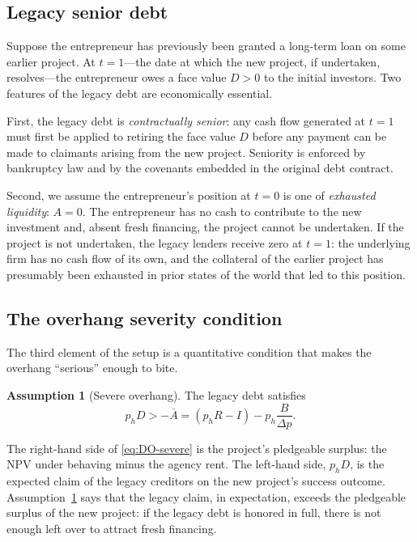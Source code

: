 \documentclass[11pt,a4paper,oneside]{book}
\theoremstyle{plain}
\theoremstyle{definition}
\newtheorem{assumption}[theorem]{Assumption}
\theoremstyle{remark}
\numberwithin{equation}{chapter}
\begin{document}
\subsection{Legacy senior debt}

Suppose the entrepreneur has previously been granted a long-term loan on some earlier project.
At $t=1$---the date at which the new project, if undertaken, resolves---the entrepreneur owes a face value $D > 0$ to the initial investors.
Two features of the legacy debt are economically essential.

First, the legacy debt is \emph{contractually senior}: any cash flow generated at $t=1$ must first be applied to retiring the face value $D$ before any payment can be made to claimants arising from the new project.
Seniority is enforced by bankruptcy law and by the covenants embedded in the original debt contract.

Second, we assume the entrepreneur's position at $t=0$ is one of \emph{exhausted liquidity}: $A = 0$.
The entrepreneur has no cash to contribute to the new investment and, absent fresh financing, the project cannot be undertaken.
If the project is not undertaken, the legacy lenders receive zero at $t=1$: the underlying firm has no cash flow of its own, and the collateral of the earlier project has presumably been exhausted in prior states of the world that led to this position.

\subsection{The overhang severity condition}

The third element of the setup is a quantitative condition that makes the overhang ``serious'' enough to bite.

\begin{assumption}[Severe overhang]\label{ass:DO-severe}
The legacy debt satisfies
\begin{equation}\label{eq:DO-severe}
  p_h D > -\overline{A} = (p_h R - I) - p_h \frac{B}{\Delta p}.
\end{equation}
\end{assumption}

The right-hand side of \eqref{eq:DO-severe} is the project's pledgeable surplus: the NPV under behaving minus the agency rent.
The left-hand side, $p_h D$, is the expected claim of the legacy creditors on the new project's success outcome.
Assumption~\ref{ass:DO-severe} says that the legacy claim, in expectation, exceeds the pledgeable surplus of the new project: if the legacy debt is honored in full, there is not enough left over to attract fresh financing.
\end{document}
